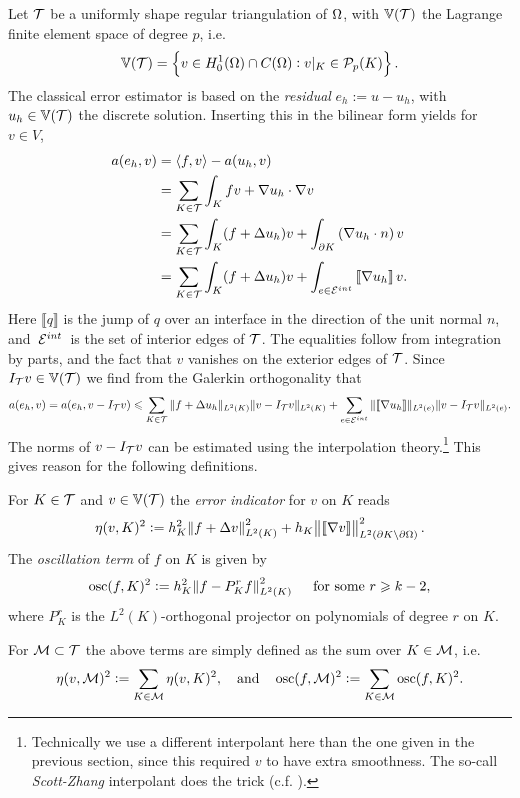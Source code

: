 \documentclass[thesis.tex]{subfiles}
\begin{document}
  Let $\mathcal{T}$ be a uniformly shape regular triangulation of $\Omega$, with $\mathbb{V}(\mathcal{T})$ the Lagrange finite element space of degree $p$, i.e. 
  \[
    \mathbb{V}(\mathcal{T}) = \set{ v \in H_0^1(\Omega) \cap C(\Omega) :  v|_K \in \mathcal{P}_p(K)}.
  \] 
  The classical error estimator is based on the \emph{residual} $e_h := u - u_h$, with $u_h\in \mathbb{V}(\mathcal{T})$ the discrete solution. Inserting this in the bilinear form yields for $v \in V$,
  \begin{align*}
    a(e_h, v) &= \left \langle f,v \right \rangle - a(u_h, v) \\
              &= \sum_{K \in \mathcal{T}} \int_K fv + \nabla u_h \cdot \nabla v \\
              &= \sum_{K \in \mathcal{T}} \int_K (f + \Delta u_h)v+\int_{\partial K} \left(\nabla u_h \cdot n\right) v\\
    &= \sum_{K \in \mathcal{T}} \int_K (f + \Delta u_h)v+\int_{e \in \mathcal{E}^{int}} \left \llbracket \nabla u_h \right \rrbracket  v.
  \end{align*}
  Here $\llbracket q \rrbracket$ is the jump of $q$ over an interface in the direction of the unit normal $n$, and~$\mathcal{E}^{int}$~is the set of interior
  edges of $\mathcal{T}$. The equalities follow from integration by parts, and the fact that $v$ vanishes on the exterior edges of $\mathcal{T}$.
  Since $I_{\mathcal{T}} v \in \mathbb{V}(\mathcal{T})$ we find from the Galerkin orthogonality that
  \[
    a(e_h, v) = a(e_h, v - I_{\mathcal{T}} v) \leqslant \sum_{K \in \mathcal{T}} \| f + \Delta u_h\|_{L^2(K)} \| v - I_{\mathcal{T}} v\|_{L^2(K)} + \sum_{e \in \mathcal{E}^{int}} \|\llbracket \nabla u_h \rrbracket \|_{L^2(e)} \|v - I_{\mathcal{T}} v\|_{L^2(e)}.
  \]
  The norms of  $v - I_{\mathcal{T}} v$ can be estimated using the interpolation theory.\footnote{Technically we use a different interpolant here than the one given in the previous section, since this required $v$ to have extra smoothness. The so-call \emph{Scott-Zhang} interpolant does the trick (c.f. \cite[Ch~4.9]{brenner}).} This gives reason for the following definitions.
  \begin{defn}
    \label{def:clasest}
    For $K \in \mathcal{T}$ and $v \in \mathbb{V}(\mathcal{T})$ the \emph{error indicator} for $v$ on $K$ reads
    \[
      \eta(v, K)^2 := h_K^2 \norm{f + \Delta v}^2_{L^2(K)} + h_K\norm{\llbracket \nabla v \rrbracket}^2_{L^2(\partial K\setminus \partial \Omega)}.
    \]
    The \emph{oscillation term} of $f$ on $K$ is given by
    \[
      \operatorname{osc}(f,K)^2 := h_K^2 \norm{f - P_K^r f}^2_{L^2(K)} \quad \text{ for some } r \geqslant k-2,
    \]
    where $P_K^r$ is the $L^2(K)$-orthogonal projector on polynomials of degree $r$ on $K$.

    For $\mathcal{M} \subset \mathcal{T}$ the above terms are simply defined as the sum over $K \in \mathcal{M}$, i.e.
    \[
      \eta(v, \mathcal{M})^2 := \sum_{K \in \mathcal{M}} \eta(v, K)^2, \quad \text{and} \quad \operatorname{osc}(f, \mathcal{M})^2 := \sum_{K \in \mathcal{M}} \operatorname{osc}(f,K)^2.
    \]
  \end{defn}
\end{document}
